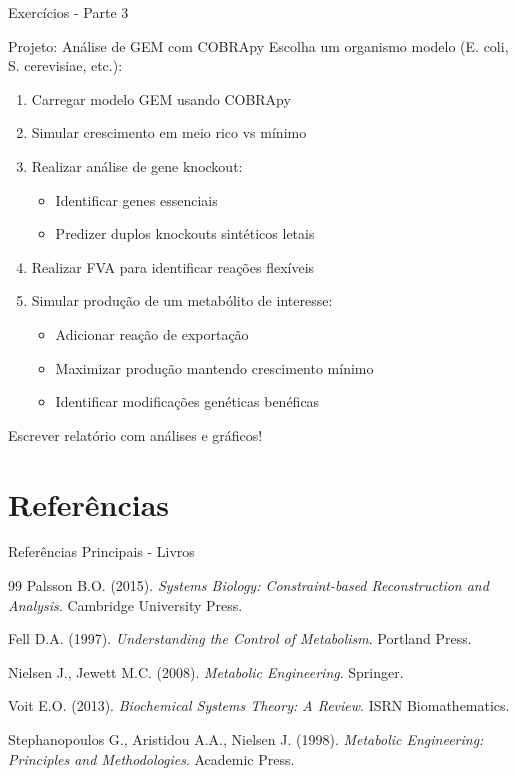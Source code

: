 \begin{frame}{Exercícios - Parte 3}
\begin{alertblock}{Projeto: Análise de GEM com COBRApy}
Escolha um organismo modelo (E. coli, S. cerevisiae, etc.):

\begin{enumerate}
    \item Carregar modelo GEM usando COBRApy
    \item Simular crescimento em meio rico vs mínimo
    \item Realizar análise de gene knockout:
    \begin{itemize}
        \item Identificar genes essenciais
        \item Predizer duplos knockouts sintéticos letais
    \end{itemize}
    \item Realizar FVA para identificar reações flexíveis
    \item Simular produção de um metabólito de interesse:
    \begin{itemize}
        \item Adicionar reação de exportação
        \item Maximizar produção mantendo crescimento mínimo
        \item Identificar modificações genéticas benéficas
    \end{itemize}
\end{enumerate}

Escrever relatório com análises e gráficos!
\end{alertblock}
\end{frame}

\section{Referências}

\begin{frame}{Referências Principais - Livros}
\begin{thebibliography}{99}
 Palsson B.O. (2015). \textit{Systems Biology: Constraint-based Reconstruction and Analysis}. Cambridge University Press.

 Fell D.A. (1997). \textit{Understanding the Control of Metabolism}. Portland Press.

 Nielsen J., Jewett M.C. (2008). \textit{Metabolic Engineering}. Springer.

 Voit E.O. (2013). \textit{Biochemical Systems Theory: A Review}. ISRN Biomathematics.

 Stephanopoulos G., Aristidou A.A., Nielsen J. (1998). \textit{Metabolic Engineering: Principles and Methodologies}. Academic Press.
\end{thebibliography}
\end{frame}

